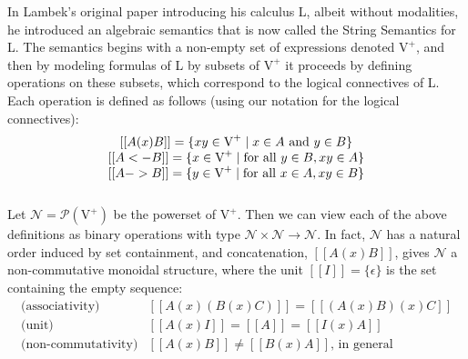 \documentclass{article}
\let\mto\to                     %
\let\to\relax                   %
\newcommand{\to}{\rightarrow}
\newcommand{\V}{\text{V}^+}
\newcommand{\N}{\mathcal{N}}
\newcommand{\pow}[1]{\mathcal{P}(#1)}
\begin{document}
In Lambek's original paper \cite{Lambek1958} introducing his calculus
L, albeit without modalities, he introduced an algebraic semantics
that is now called the String Semantics for L.  The semantics begins
with a non-empty set of expressions denoted $\V$, and then by modeling
formulas of L by subsets of $\V$ it proceeds by defining operations on
these subsets, which correspond to the logical connectives of L.  Each
operation is defined as follows (using our notation for the logical
connectives):
\[
\begin{array}{c}
  [[A (x) B]] = \{xy \in \V \mid x \in A \text{ and } y \in B\}\\ \relax
  [[A <- B]] = \{x \in \V \mid \text{for all } y \in B, xy \in A\}\\ \relax
  [[A -> B]] = \{y \in \V \mid \text{for all } x \in A, xy \in B\}\\ \relax
\end{array}
\]
Let $\N = \pow{\V}$ be the powerset of $\V$.  Then we can view each of
the above definitions as binary operations with type $\N \times \N \mto
\N$. In fact, $\N$ has a natural order induced by set containment, and
concatenation, $[[A (x) B]]$, gives $\N$ a non-commutative monoidal
structure, where the unit $[[I]] = \{\epsilon\}$ is the set containing
the empty sequence:
\[
\begin{array}{lll}
  \text{(associativity)} & [[A (x) (B (x) C)]] = [[(A (x) B) (x) C]]\\
  \text{(unit)} & [[A (x) I]] = [[A]] = [[I (x) A]]\\
  \text{(non-commutativity)} & [[A (x) B]] \neq [[B (x) A]]\text{, in general}
\end{array}
\]
\end{document}
